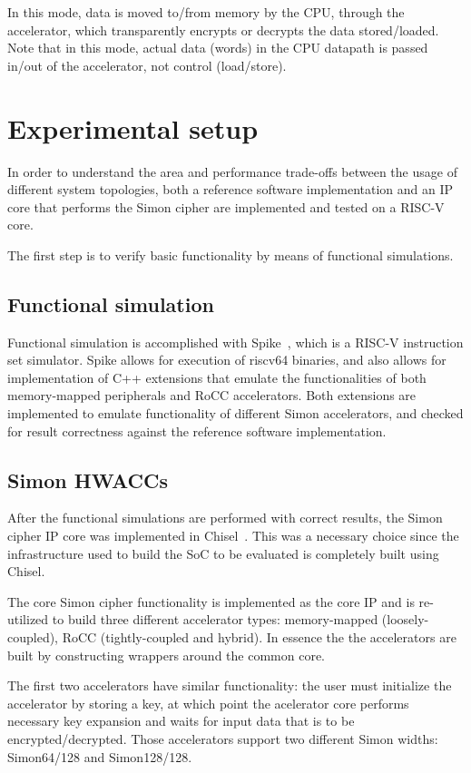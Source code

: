 \documentclass[10pt,conference]{IEEEtran}
\begin{document}
In this mode, data is moved to/from memory by the CPU, through the accelerator,
which transparently encrypts or decrypts the data stored/loaded. Note that in
this mode, actual data (words) in the CPU datapath is passed in/out of the
accelerator, not control (load/store).

\section{Experimental setup}

In order to understand the area and performance trade-offs between the usage of
different system topologies, both a reference software implementation and an IP
core that performs the Simon cipher are implemented and tested on a RISC-V core.

The first step is to verify basic functionality by means of functional simulations.

\subsection{Functional simulation}

Functional simulation is accomplished with Spike~\cite{spike}, which is a RISC-V
instruction set simulator. Spike allows for execution of riscv64 binaries, and
also allows for implementation of C++ extensions that emulate the
functionalities of both memory-mapped peripherals and RoCC accelerators. Both
extensions are implemented to emulate functionality of different Simon
accelerators, and checked for result correctness against the reference software
implementation.


\subsection{Simon HWACCs}

After the functional simulations are performed with correct results, the Simon
cipher IP core was implemented in Chisel~\cite{chisel}. This was a necessary
choice since the infrastructure used to build the SoC to be evaluated is
completely built using Chisel.

The core Simon cipher functionality is implemented as the core IP and is
re-utilized to build three different accelerator types: memory-mapped
(loosely-coupled), RoCC (tightly-coupled and hybrid). In essence the the
accelerators are built by constructing wrappers around the common core.

The first two accelerators have similar functionality: the user must initialize the
accelerator by storing a key, at which point the acelerator core performs
necessary key expansion and waits for input data that is to be
encrypted/decrypted. Those accelerators support two different Simon widths:
Simon64/128 and Simon128/128.
\end{document}
